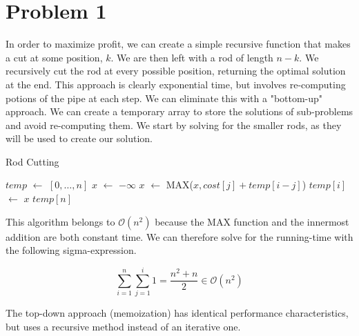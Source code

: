 \documentclass{article}
\newenvironment{problem}[1]{
  \nobreak\section*{Problem #1}
}{}
\newcommand*{\Let}[2]{\State #1 $\gets$ #2}
\newcommand*{\bigO}[1]{\ensuremath{\mathcal{O}\left(#1\right)}}
\begin{document}
  \begin{problem}{1}
    In order to maximize profit, we can create a simple recursive
    function that makes a cut at some position, $k$.  We are then
    left with a rod of length $n - k$.  We recursively cut the rod
    at every possible position, returning the optimal solution at
    the end.  This approach is clearly exponential time, but
    involves re-computing potions of the pipe at each step.  We
    can eliminate this with a "bottom-up" approach.  We can create
    a temporary array to store the solutions of sub-problems and
    avoid re-computing them.  We start by solving for the smaller
    rods, as they will be used to create our solution.

    \begin{algorithm}
      \caption{Rod Cutting}
      \begin{algorithmic}[1]
          \Let{$temp$}{$[0, \dotso, n]$}
            \Let{$x$}{$-\infty$}
              \Let{$x$}{MAX($x, cost[j] + temp[i - j]$)}
            \EndFor
            \Let{$temp[i]$}{$x$}
          \EndFor
          \State \Return $temp[n]$
        \EndFunction
      \end{algorithmic}
    \end{algorithm}

    This algorithm belongs to \bigO{n^2} because the MAX function
    and the innermost addition are both constant time.  We can
    therefore solve for the running-time with the following 
    sigma-expression.

    \begin{displaymath}
      \sum_{i = 1}^{n} \sum_{j = 1}^{i} 1 = \frac{n^2 + n}{2} \in \bigO{n^2}
    \end{displaymath}

    The top-down approach (memoization) has identical performance
    characteristics, but uses a recursive method instead of an
    iterative one.
  \end{problem}

  \pagebreak
\end{document}
